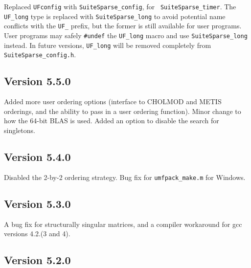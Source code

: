\documentclass[11pt]{article}
\begin{document}
Replaced {\tt UFconfig} with {\tt SuiteSparse\_config}, for {\tt
SuiteSparse\_timer}.  The \verb'UF_long' type is replaced with
\verb'SuiteSparse_long' to avoid potential name conflicts with the {\tt UF\_}
prefix, but the former is still available for user programs.  User programs may
safely {\tt \#undef} the \verb'UF_long' macro and use \verb'SuiteSparse_long'
instead.  In future versions, \verb'UF_long' will be removed completely from
{\tt SuiteSparse\_config.h}.

\subsection{Version 5.5.0}

Added more user ordering options (interface to CHOLMOD and METIS orderings,
and the ability to pass in a user ordering function).
Minor change to how the 64-bit BLAS is used.
Added an option to disable the search for singletons.

\subsection{Version 5.4.0}

Disabled the 2-by-2 ordering strategy.
Bug fix for \verb'umfpack_make.m' for Windows.

\subsection{Version 5.3.0}

A bug fix for structurally singular matrices, and a compiler workaround for
gcc versions 4.2.(3 and 4).

\subsection{Version 5.2.0}
\end{document}
